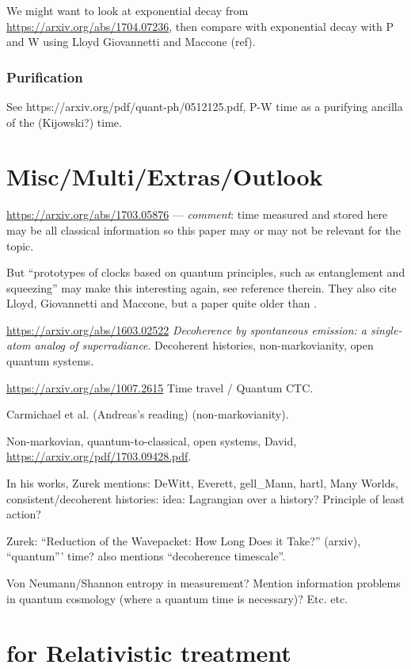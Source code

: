 We might want to look at exponential decay from \url{https://arxiv.org/abs/1704.07236},
then compare with exponential decay with P and W using Lloyd Giovannetti and Maccone (ref).

\subsubsection{Purification}

See https://arxiv.org/pdf/quant-ph/0512125.pdf, P-W time as a purifying ancilla
of the (Kijowski?) time.

\section{Misc/Multi/Extras/Outlook}

\url{https://arxiv.org/abs/1703.05876}
--- \emph{comment}: time measured and stored here
may be all classical information
so this paper may or may not be relevant for the topic.

But
``prototypes of clocks based on quantum principles,
such as entanglement and squeezing''
may make this interesting again, see reference therein.
They also cite Lloyd, Giovannetti and Maccone,
but a paper quite older than \cite{Lloyd:Time}.

\url{https://arxiv.org/abs/1603.02522}
\emph{Decoherence by spontaneous emission: a single-atom analog of superradiance}.
Decoherent histories, non-markovianity, open quantum systems.

\url{https://arxiv.org/abs/1007.2615} Time travel / Quantum CTC.

Carmichael et al. \cite{CarmichaelOQS2017} (Andreas's reading)
(non-markovianity).

Non-markovian, quantum-to-classical, open systems, David,
\url{https://arxiv.org/pdf/1703.09428.pdf}.

In his works, Zurek mentions:
DeWitt, Everett, gell_Mann, hartl, Many Worlds, consistent/decoherent histories:
idea: Lagrangian over a history? Principle of least action?

Zurek: ``Reduction of the Wavepacket: How Long Does it Take?'' (arxiv),
``quantum''' time? \cite{Zurek_Einselect} also mentions
``decoherence timescale''.

Von Neumann/Shannon entropy in measurement? Mention information problems
in quantum cosmology (where a quantum time is necessary)? Etc. etc.

\section{for Relativistic treatment}

